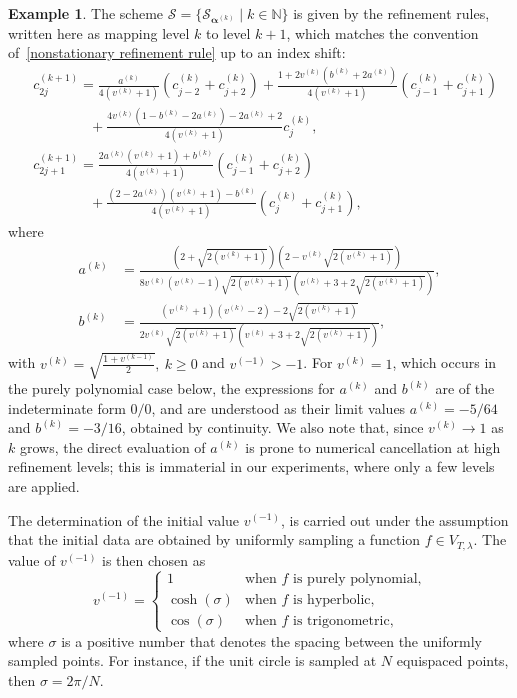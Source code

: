 \documentclass[11pt,a4paper]{article}
\newcommand{\N}{\mathbb{N}}
\theoremstyle{definition}
\newtheorem{example}[theorem]{Example}
\begin{document}
\begin{example} \label{example:geometric_scheme}
The scheme $\boldsymbol{\mathcal{S}}=\{\mathcal{S}_{\boldsymbol{\alpha}^{(k)}} \mid k\in\N\}$ is given by the refinement rules, written here as mapping level $k$ to level $k+1$, which matches the convention of~\eqref{nonstationary refinement rule} up to an index shift:
\begin{equation} \label{NS geometric scheme}
\begin{split}    
    & c_{2j}^{(k+1)}=\frac{a^{(k)}}{4(v^{(k)}+1)} (c_{j-2}^{(k)}+c_{j+2}^{(k)})+\frac{1+2v^{(k)}(b^{(k)}+2a^{(k)})}{4(v^{(k)}+1)}(c_{j-1}^{(k)}+c_{j+1}^{(k)}) \\
    & \qquad \qquad +\frac{4v^{(k)}(1-b^{(k)}-2a^{(k)})-2a^{(k)}+2}{4(v^{(k)}+1)}c_{j}^{(k)},\\
    & c_{2j+1}^{(k+1)}=\frac{2a^{(k)}(v^{(k)}+1)+b^{(k)}}{4(v^{(k)}+1)}(c_{j-1}^{(k)}+c_{j+2}^{(k)})\\
    & \qquad \qquad +\frac{(2-2a^{(k)})(v^{(k)}+1)-b^{(k)}}{4(v^{(k)}+1)}(c_{j}^{(k)}+c_{j+1}^{(k)}),
\end{split}
\end{equation}
where 
\begin{equation}
\begin{split}
    a^{(k)} & =\frac{(2+\sqrt{2(v^{(k)}+1)})(2-v^{(k)}\sqrt{2(v^{(k)}+1)})}{8v^{(k)}(v^{(k)}-1)\sqrt{2(v^{(k)}+1)}(v^{(k)}+3+2\sqrt{2(v^{(k)}+1)})},\\
    b^{(k)} & =\frac{(v^{(k)}+1)(v^{(k)}-2)-2\sqrt{2(v^{(k)}+1)}}{2v^{(k)}\sqrt{2(v^{(k)}+1)}(v^{(k)}+3+2\sqrt{2(v^{(k)}+1)})},
\end{split}
\end{equation}
with $v^{(k)}=\sqrt{\frac{1+v^{(k-1)}}{2}}, \ k \geq 0$ and $v^{(-1)}>-1$. For $v^{(k)}=1$, which occurs in the purely polynomial case below, the expressions for $a^{(k)}$ and $b^{(k)}$ are of the indeterminate form $0/0$, and are understood as their limit values $a^{(k)}=-5/64$ and $b^{(k)}=-3/16$, obtained by continuity. We also note that, since $v^{(k)}\rightarrow1$ as $k$ grows, the direct evaluation of $a^{(k)}$ is prone to numerical cancellation at high refinement levels; this is immaterial in our experiments, where only a few levels are applied.

The determination of the initial value $v^{(-1)}$, is carried out under the assumption that the initial data are obtained by uniformly sampling a function $f \in V_{T,\lambda}$. The value of $v^{(-1)}$ is then chosen as
\begin{equation}
    v^{(-1)}=
    \begin{cases}
        1 & \text{when $f$ is purely polynomial,}\\
        \cosh(\sigma) & \text{when $f$ is hyperbolic,}\\
        \cos(\sigma) & \text{when $f$ is trigonometric,}
    \end{cases}
\end{equation}
where $\sigma$ is a positive number that denotes the spacing between the uniformly sampled points. For instance, if the unit circle is sampled at $N$ equispaced points, then $\sigma=2\pi/N$.
\end{example}
\end{document}
